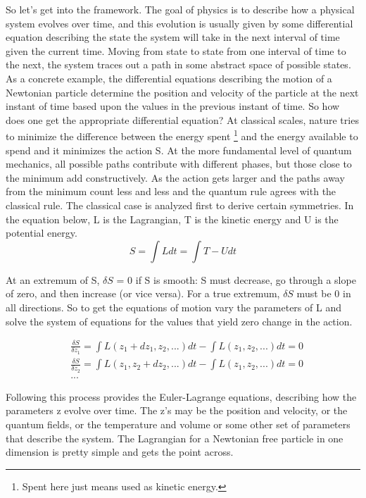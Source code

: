 So let's get into the framework. The goal of physics is to describe how a physical system evolves over time, and this evolution is usually given by some differential equation describing the state the system will take in the next interval of time given the current time. Moving from state to state from one interval of time to the next, the system traces out a path in some abstract space of possible states. As a concrete example, the differential equations describing the motion of a Newtonian particle determine the position and velocity of the particle at the next instant of time based upon the values in the previous instant of time. So how does one get the appropriate differential equation? At classical scales, nature tries to minimize the difference between the energy spent \footnote{Spent here just means used as kinetic energy.} and the energy available to spend and it minimizes the action S. At the more fundamental level of quantum mechanics, all possible paths contribute with different phases, but those close to the minimum add constructively. As the action gets larger and the paths away from the minimum count less and less and the quantum rule agrees with the classical rule. The classical case is analyzed first to derive certain symmetries. In the equation below, L is the Lagrangian, T is the kinetic energy and U is the potential energy.     
\begin{equation}
S = \int L dt = \int T - U dt
\end{equation}

At an extremum of S, $\delta S$ = 0 if S is smooth: S must decrease, go through a slope of zero, and then increase (or vice versa). For a true extremum, $\delta S$ must be 0 in all directions. So to get the equations of motion vary the parameters of L and solve the system of equations for the values that yield zero change in the action.

\begin{equation}
\begin{split}
&\frac{\delta S}{\delta z_1} = \int L(z_1 + dz_1, z_2, ...)dt - \int L(z_1, z_2, ...)dt = 0 \\
&\frac{\delta S}{\delta z_2} = \int L(z_1, z_2 + dz_2, ...)dt - \int L(z_1, z_2, ...)dt = 0 \\
&...
\end{split}
\end{equation}

Following this process provides the Euler-Lagrange equations, describing how the parameters z evolve over time. The z's may be the position and velocity, or the quantum fields, or the temperature and volume or some other set of parameters that describe the system. The Lagrangian for a Newtonian free particle in one dimension is pretty simple and gets the point across. 


